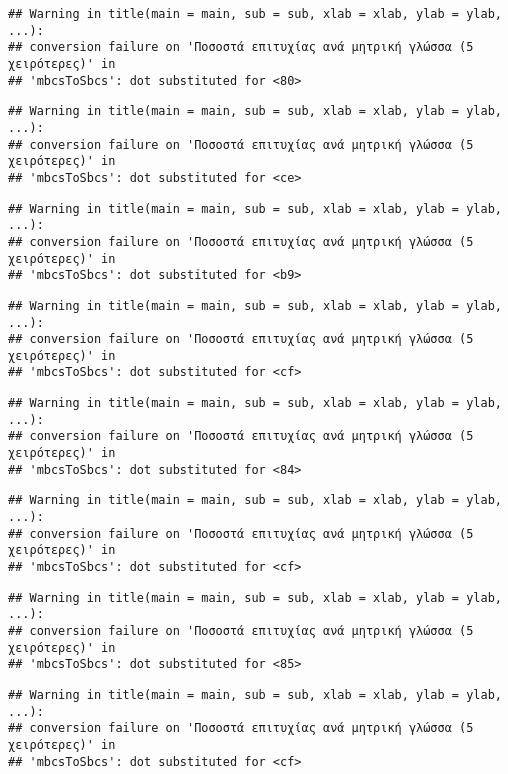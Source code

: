 \documentclass[
]{article}
\begin{document}
\begin{verbatim}
## Warning in title(main = main, sub = sub, xlab = xlab, ylab = ylab, ...):
## conversion failure on 'Ποσοστά επιτυχίας ανά μητρική γλώσσα (5 χειρότερες)' in
## 'mbcsToSbcs': dot substituted for <80>
\end{verbatim}

\begin{verbatim}
## Warning in title(main = main, sub = sub, xlab = xlab, ylab = ylab, ...):
## conversion failure on 'Ποσοστά επιτυχίας ανά μητρική γλώσσα (5 χειρότερες)' in
## 'mbcsToSbcs': dot substituted for <ce>
\end{verbatim}

\begin{verbatim}
## Warning in title(main = main, sub = sub, xlab = xlab, ylab = ylab, ...):
## conversion failure on 'Ποσοστά επιτυχίας ανά μητρική γλώσσα (5 χειρότερες)' in
## 'mbcsToSbcs': dot substituted for <b9>
\end{verbatim}

\begin{verbatim}
## Warning in title(main = main, sub = sub, xlab = xlab, ylab = ylab, ...):
## conversion failure on 'Ποσοστά επιτυχίας ανά μητρική γλώσσα (5 χειρότερες)' in
## 'mbcsToSbcs': dot substituted for <cf>
\end{verbatim}

\begin{verbatim}
## Warning in title(main = main, sub = sub, xlab = xlab, ylab = ylab, ...):
## conversion failure on 'Ποσοστά επιτυχίας ανά μητρική γλώσσα (5 χειρότερες)' in
## 'mbcsToSbcs': dot substituted for <84>
\end{verbatim}

\begin{verbatim}
## Warning in title(main = main, sub = sub, xlab = xlab, ylab = ylab, ...):
## conversion failure on 'Ποσοστά επιτυχίας ανά μητρική γλώσσα (5 χειρότερες)' in
## 'mbcsToSbcs': dot substituted for <cf>
\end{verbatim}

\begin{verbatim}
## Warning in title(main = main, sub = sub, xlab = xlab, ylab = ylab, ...):
## conversion failure on 'Ποσοστά επιτυχίας ανά μητρική γλώσσα (5 χειρότερες)' in
## 'mbcsToSbcs': dot substituted for <85>
\end{verbatim}

\begin{verbatim}
## Warning in title(main = main, sub = sub, xlab = xlab, ylab = ylab, ...):
## conversion failure on 'Ποσοστά επιτυχίας ανά μητρική γλώσσα (5 χειρότερες)' in
## 'mbcsToSbcs': dot substituted for <cf>
\end{verbatim}
\end{document}
